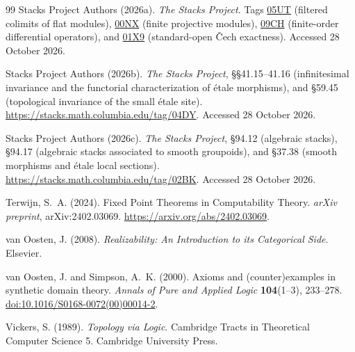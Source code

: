 \documentclass[11pt,a4paper]{article}
\numberwithin{algorithm}{section}
\numberwithin{equation}{section}
\theoremstyle{definition}
\theoremstyle{remark}
\theoremstyle{plain}
\theoremstyle{definition}
\theoremstyle{plain}
\begin{document}
\begin{thebibliography}{99}
Stacks Project Authors (2026a).
\emph{The Stacks Project}.
Tags \href{https://stacks.math.columbia.edu/tag/05UT}{05UT}
(filtered colimits of flat modules),
\href{https://stacks.math.columbia.edu/tag/00NX}{00NX}
(finite projective modules),
\href{https://stacks.math.columbia.edu/tag/09CH}{09CH}
(finite-order differential operators), and
\href{https://stacks.math.columbia.edu/tag/01X9}{01X9}
(standard-open \v{C}ech exactness).
Accessed 28 October 2026.

Stacks Project Authors (2026b).
\emph{The Stacks Project}, \S\S 41.15--41.16
(infinitesimal invariance and the functorial characterization
of \'etale morphisms), and \S 59.45 (topological invariance
of the small \'etale site).
\url{https://stacks.math.columbia.edu/tag/04DY}.
Accessed 28 October 2026.

Stacks Project Authors (2026c).
\emph{The Stacks Project}, \S 94.12 (algebraic stacks),
\S 94.17 (algebraic stacks associated to smooth groupoids),
and \S 37.38 (smooth morphisms and \'etale local sections).
\url{https://stacks.math.columbia.edu/tag/02BK}.
Accessed 28 October 2026.

Terwijn, S.~A. (2024).
Fixed Point Theorems in Computability Theory.
\emph{arXiv preprint}, arXiv:2402.03069.
\url{https://arxiv.org/abs/2402.03069}.

van Oosten, J. (2008).
\emph{Realizability: An Introduction to its Categorical Side}.
Elsevier.

van Oosten, J. and Simpson, A.~K. (2000).
Axioms and (counter)examples in synthetic domain theory.
\emph{Annals of Pure and Applied Logic} \textbf{104}(1--3), 233--278.
\href{https://doi.org/10.1016/S0168-0072(00)00014-2}{doi:10.1016/S0168-0072(00)00014-2}.

Vickers, S. (1989).
\emph{Topology via Logic}.
Cambridge Tracts in Theoretical Computer Science 5.
Cambridge University Press.

\end{thebibliography}
\end{document}
